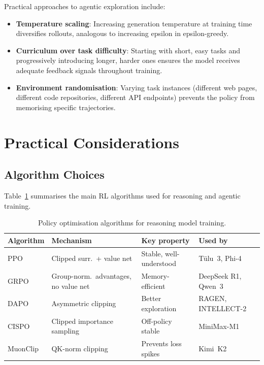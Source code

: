 Practical approaches to agentic exploration include:

\begin{itemize}[leftmargin=*]
\item \textbf{Temperature scaling}: Increasing generation temperature
  at training time diversifies rollouts, analogous to increasing
  epsilon in epsilon-greedy.

\item \textbf{Curriculum over task difficulty}: Starting with short,
  easy tasks and progressively introducing longer, harder ones ensures
  the model receives adequate feedback signals throughout training.

\item \textbf{Environment randomisation}: Varying task instances
  (different web pages, different code repositories, different API
  endpoints) prevents the policy from memorising specific trajectories.
\end{itemize}

\section{Practical Considerations}
\label{sec:practical-reasoning}

\subsection{Algorithm Choices}
\label{subsec:algorithm-choices}

Table~\ref{tab:reasoning-algorithms} summarises the main RL algorithms
used for reasoning and agentic training.

\begin{table}[ht]
\centering
\footnotesize
\caption{Policy optimisation algorithms for reasoning model training.}
\label{tab:reasoning-algorithms}
\begin{tabular}{@{}lp{3.5cm}p{2.5cm}p{2.5cm}@{}}
\toprule
\textbf{Algorithm} & \textbf{Mechanism} & \textbf{Key property}
  & \textbf{Used by} \\
\midrule
PPO & Clipped surr.\ + value net
  & Stable, well-understood & Tülu~3, Phi-4 \\
GRPO & Group-norm.\ advantages, no value net
  & Memory-efficient & DeepSeek R1, Qwen~3 \\
DAPO & Asymmetric clipping
  & Better exploration & RAGEN, INTELLECT-2 \\
CISPO & Clipped importance sampling
  & Off-policy stable & MiniMax-M1 \\
MuonClip & QK-norm clipping
  & Prevents loss spikes & Kimi~K2 \\
\bottomrule
\end{tabular}
\end{table}

